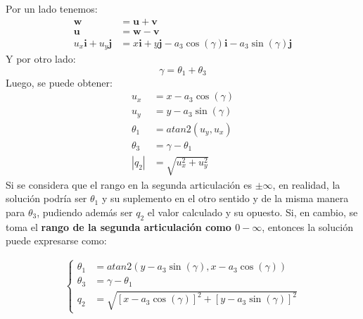 \documentclass[a4paper,12pt]{article}
\begin{document}
Por un lado tenemos:
\begin{align*}
    \mathbf{w} &= \mathbf{u} + \mathbf{v}\\
    \mathbf{u} &= \mathbf{w} - \mathbf{v}\\
    u_x\mathbf{i} + u_y\mathbf{j} &= x\mathbf{i} + y\mathbf{j} - a_3\cos(\gamma)\mathbf{i} - a_3\sin(\gamma)\mathbf{j}
\end{align*}
Y por otro lado:
\begin{equation}
    \gamma = \theta_1 + \theta_3
\end{equation}
Luego, se puede obtener:
\begin{align*}
    u_x &= x - a_3\cos(\gamma)\\
    u_y &= y - a_3\sin(\gamma)\\
    \theta_1 &= atan2(u_y, u_x)\\
    \theta_3 &= \gamma - \theta_1\\
    |q_2| &= \sqrt{u_x^2 + u_y^2}
\end{align*}
Si se considera que el rango en la segunda articulación es $\pm \infty$, en realidad, la solución podría ser $\theta_1$ y su suplemento en el otro sentido y de la misma manera para $\theta_3$, pudiendo además ser $q_2$ el valor calculado y su opuesto.
Si, en cambio, se toma el \textbf{rango de la segunda articulación como $0-\infty$}, entonces la solución puede expresarse como:

\begin{align}
    \begin{cases}
        \theta_1 &= atan2(y - a_3\sin(\gamma), x - a_3\cos(\gamma))\\
        \theta_3 &= \gamma - \theta_1\\
        q_2 &= \sqrt{\left[x - a_3\cos(\gamma)\right]^2 + \left[y - a_3\sin(\gamma)\right]^2}
    \end{cases}
\end{align}


\end{document}
